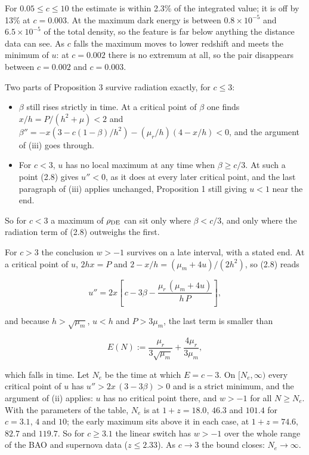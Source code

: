 \documentclass[11pt,a4paper]{article}
\begin{document}
For $0.05 \le c \le 10$ the estimate is within 2.3\% of the integrated value; it is off by 13\% at $c = 0.003$. At the
maximum dark energy is between $0.8\times10^{-5}$ and $6.5\times10^{-5}$ of the total density, so the feature is far below
anything the distance data can see. As $c$ falls the maximum moves to lower redshift and meets the minimum of $u$:
at $c = 0.002$ there is no extremum at all, so the pair disappears between $c = 0.002$ and $c = 0.003$.

Two parts of Proposition 3 survive radiation exactly, for $c \le 3$:

\begin{itemize}
\item{} $\beta$ still rises strictly in time. At a critical point of $\beta$ one finds $x/h = P/(h^2 + \mu) < 2$ and
$\beta'' = -x\left(3 - c(1 - \beta)/h^2\right) - (\mu_r/h)(4 - x/h) < 0$, and the argument of (iii) goes through.
\item{} For $c < 3$, $u$ has no local maximum at any time when $\beta \ge c/3$. At such a point (2.8) gives $u'' < 0$, as it
does at every later critical point, and the last paragraph of (iii) applies unchanged, Proposition 1 still giving
$u < 1$ near the end.
\end{itemize}

So for $c < 3$ a maximum of $\rho_{\rm DE}$ can sit only where $\beta < c/3$, and only where the radiation term of (2.8)
outweighs the first.

For $c > 3$ the conclusion $w > -1$ survives on a late interval, with a stated end. At a critical point of $u$,
$2hx = P$ and $2 - x/h = (\mu_m + 4u)/(2h^2)$, so (2.8) reads


\begin{equation*}
u'' = 2x\left[\,c - 3\beta - \frac{\mu_r\,(\mu_m + 4u)}{h\,P}\right],
\end{equation*}


and because $h > \sqrt{\mu_m}$, $u < h$ and $P > 3\mu_m$, the last term is smaller than


\begin{equation*}
E(N) := \frac{\mu_r}{3\sqrt{\mu_m}} + \frac{4\mu_r}{3\mu_m},
\end{equation*}


which falls in time. Let $N_e$ be the time at which $E = c - 3$. On $[N_e, \infty)$ every critical point of $u$ has
$u'' > 2x\,(3 - 3\beta) > 0$ and is a strict minimum, and the argument of (ii) applies: $u$ has no critical point
there, and $w > -1$ for all $N \ge N_e$. With the parameters of the table, $N_e$ is at $1 + z = 18.0$, $46.3$ and
$101.4$ for $c = 3.1$, $4$ and $10$; the early maximum sits above it in each case, at $1 + z = 74.6$, $82.7$ and
$119.7$. So for $c \ge 3.1$ the linear switch has $w > -1$ over the whole range of the BAO and supernova data
($z \le 2.33$). As $c \to 3$ the bound closes: $N_e \to \infty$.
\end{document}
